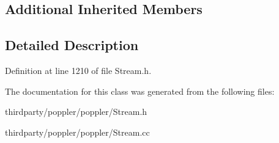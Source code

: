 \subsection*{Additional Inherited Members}


\subsection{Detailed Description}


Definition at line 1210 of file Stream.\+h.



The documentation for this class was generated from the following files\+:\begin{DoxyCompactItemize}
\item 
thirdparty/poppler/poppler/Stream.\+h\item 
thirdparty/poppler/poppler/Stream.\+cc\end{DoxyCompactItemize}
